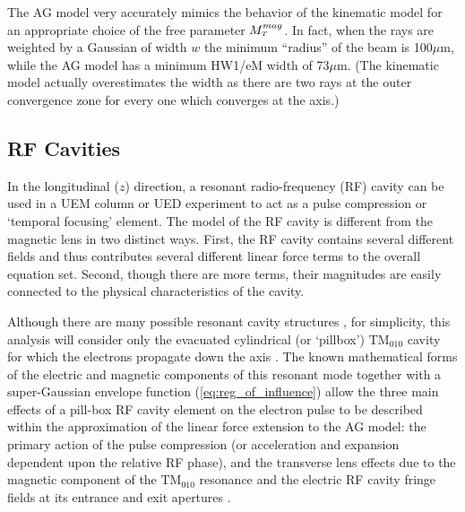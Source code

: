 The AG model very accurately mimics the behavior of the kinematic model for an appropriate choice of the free parameter $M_{{\scriptscriptstyle T}}^{mag}$.
In fact, when the rays are weighted by a Gaussian of width $w$ the minimum ``radius'' of the beam is 100$\mu$m, while the AG model has a minimum HW1/eM width of 73$\mu$m.
(The kinematic model actually overestimates the width as there are two rays at the outer convergence zone for every one which converges at the axis.) 

\subsection{RF Cavities} \label{rf_cav_model}

In the longitudinal ($ z $) direction, a resonant radio-frequency (RF) cavity can be used in a UEM column or UED experiment \cite{oudheusden_electron_2007,fill_sub-fs_2006} to act as a pulse compression or `temporal focusing' element.
The model of the RF cavity is different from the magnetic lens in two distinct ways.
First, the RF cavity contains several different fields and thus contributes several different linear force terms to the overall equation set.
Second, though there are more terms, their magnitudes are easily connected to the physical characteristics of the cavity.

Although there are many possible resonant cavity structures \cite{oudheusden_electron_2007,humphries_principles_1986}, for simplicity, this analysis will consider only the evacuated cylindrical (or `pillbox') $\text{TM}_{010}$ cavity for which the electrons propagate down the axis \cite{fill_sub-fs_2006,humphries_principles_1986}.
The known mathematical forms of the electric and magnetic components of this resonant mode together with a super-Gaussian envelope function (\ref{eq:reg_of_influence}) allow the three main effects of a pill-box RF cavity element on the electron pulse to be described within the approximation of the linear force extension to the AG model: the primary action of the pulse compression (or acceleration and expansion dependent upon the relative RF phase), and the transverse lens effects due to the magnetic component of the $\text{TM}_{010}$ resonance and the electric RF cavity fringe fields at its entrance and exit apertures \cite{kim_rf_1989}.

